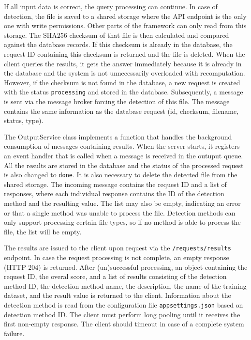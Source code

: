 If all input data is correct, the query processing can continue. In case of detection, the file is saved to a shared storage where the API endpoint is the only one with write permissions. Other parts of the framework can only read from this storage. The SHA256 checksum of that file is then calculated and compared against the database records. If this checksum is already in the database, the request ID containing this checksum is returned and the file is deleted. When the client queries the results, it gets the answer immediately because it is already in the database and the system is not unnecessarily overloaded with recomputation. However, if the checksum is not found in the database, a new request is created with the status \texttt{processing} and stored in the database. Subsequently, a message is sent via the message broker forcing the detection of this file. The message contains the same information as the database request (id, checksum, filename, status, type).

The OutputService class implements a function that handles the background consumption of messages containing results. When the server starts, it registers an event handler that is called when a message is received in the outuput queue. All the results are stored in the database and the status of the processed request is also changed to \texttt{done}. It is also necessary to delete the detected file from the shared storage. The incoming message contains the request ID and a list of responses, where each individual response contains the ID of the detection method and the resulting value. The list may also be empty, indicating an error or that a single method was unable to process the file. Detection methods can only support processing certain file types, so if no method is able to process the file, the list will be empty.

The results are issued to the client upon request via the \texttt{/requests/results} endpoint. In case the request processing is not complete, an empty response (HTTP 204) is returned. After (un)successful processing, an object containing the request ID, the overal score, and a list of results consisting of the detection method ID, the detection method name, the description, the name of the training dataset, and the result value is returned to the client. Information about the detection method is read from the configuration file \texttt{appsettings.json} based on detection method ID. The client must perform long pooling until it receives the first non-empty response. The client should timeout in case of a complete system failure.

